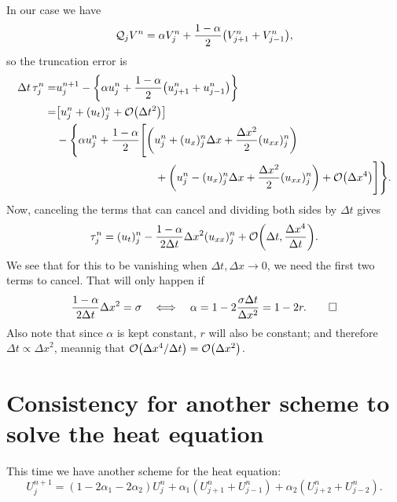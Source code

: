 \documentclass[11pt,letter, swedish, english
]{article}
\newcommand{\Dx}{\ensuremath{\Delta{x}}}
\newcommand{\Dt}{\ensuremath{\Delta{t}}}
\begin{document}
In our case we have
\begin{equation}
\mathcal{Q}_jV^n=\alpha V_j^n+\frac{1-\alpha}{2}\qty(V_{j+1}^n+V_{j-1}^n),
\end{equation}
so the truncation error is
\begin{equation}
\begin{aligned}
\Dt\,\tau_j^n=&u_j^{n+1}
-\qty{\alpha u_j^n+\frac{1-\alpha}{2}\qty(u_{j+1}^n+u_{j-1}^n)}\\
=& \qty[u_j^n+(u_t)_j^n+\order{\Dt^2}]\\
&-\Bigg\{\alpha u_j^n+\frac{1-\alpha}{2}
\Bigg[\qty(u_j^n+(u_x)_j^n\Dx+\frac{\Dx^2}{2}(u_{xx})_j^n)\\
&\hspace{90pt}+\qty(u_j^n-(u_x)_j^n\Dx+\frac{\Dx^2}{2}(u_{xx})_j^n)
+\order{\Dx^4}\Bigg]\Bigg\}.
\end{aligned}
\end{equation}
Now, canceling the terms that can cancel and dividing both sides by
$\Dt$ gives
\begin{equation}
\tau_j^n=(u_t)_j^n-\frac{1-\alpha}{2\Dt}\Dx^2(u_{xx})_j^n
+\order{\Dt, \frac{\Dx^4}{\Dt}}.
\end{equation}
We see that for this to be vanishing when $\Dt, \Dx\to0$, we need the
first two terms to cancel. That will only happen if
\begin{equation}
\frac{1-\alpha}{2\Dt}\Dx^2=\sigma
\quad\Longleftrightarrow\quad
\alpha=1-2\frac{\sigma\Dt}{\Dx^2}=1-2r.
\qed
\end{equation}
Also note that since $\alpha$ is kept constant, $r$ will also be
constant; and therefore $\Dt\propto\Dx^2$, meannig that
$\order{\Dx^4/\Dt}=\order{\Dx^2}$.

\section{Consistency for another scheme to solve the heat equation}
This time we have another scheme for the heat equation:
\begin{equation}
U_{j}^{n+1}=(1-2\alpha_1-2\alpha_2)U_{j}^{n}
+\alpha_1(U_{j+1}^n+U_{j-1}^n)+\alpha_2(U_{j+2}^n+U_{j-2}^n).
\end{equation}
\end{document}
